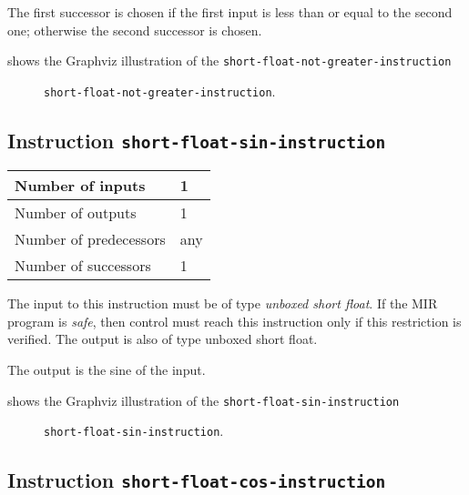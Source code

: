 The first successor is chosen if the first input is less than or equal
to the second one; otherwise the second successor is chosen.

 shows the Graphviz illustration of the
\texttt{short-float-not-greater-instruction}

\begin{figure}
\begin{center}
\end{center}
\caption{\label{fig-short-float-not-greater-instruction}
\texttt{short-float-not-greater-instruction}.}
\end{figure}

\subsection{Instruction \texttt{short-float-sin-instruction}}
\label{mir-instruction-short-float-div}

\begin{tabular}{|l|l|}
\hline
Number of inputs & 1\\
\hline
Number of outputs & 1\\
\hline
Number of predecessors & any\\
\hline
Number of successors & 1\\
\hline
\end{tabular}

The input to this instruction must be of type \emph{unboxed short
  float}.  If the MIR program is \emph{safe}, then control must reach
this instruction only if this restriction is verified.  The output is
also of type unboxed short float.

The output is the sine of the input.

 shows the Graphviz illustration of the
\texttt{short-float-sin-instruction}

\begin{figure}
\begin{center}
\end{center}
\caption{\label{fig-short-float-sin-instruction}
\texttt{short-float-sin-instruction}.}
\end{figure}

\subsection{Instruction \texttt{short-float-cos-instruction}}
\label{mir-instruction-short-float-div}

